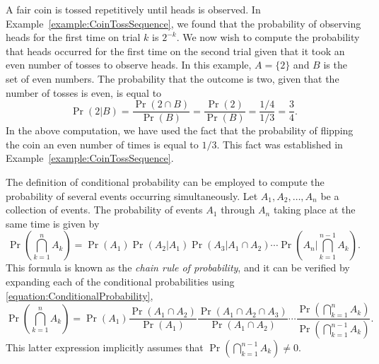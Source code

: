 \begin{example}
A fair coin is tossed repetitively until heads is observed.
In Example~\ref{example:CoinTossSequence}, we found that the probability of observing heads for the first time on trial $k$ is $2^{-k}$.
We now wish to compute the probability that heads occurred for the first time on the second trial given that it took an even number of tosses to observe heads.
In this example, $A = \{ 2 \}$ and $B$ is the set of even numbers.
The probability that the outcome is two, given that the number of tosses is even, is equal to
\begin{equation*}
\Pr ( 2 | B )
= \frac{\Pr ( 2 \cap B )}{\Pr (B)}
= \frac{\Pr (2)}{\Pr (B)}
= \frac{1/4}{1/3}
= \frac{3}{4} .
\end{equation*}
In the above computation, we have used the fact that the probability of flipping the coin an even number of times is equal to $1/3$.
This fact was established in Example~\ref{example:CoinTossSequence}.
\end{example}

The definition of conditional probability can be employed to compute the probability of several events occurring simultaneously.
Let $A_1, A_2, \ldots, A_n$ be a collection of events.
The probability of events $A_1$ through $A_n$ taking place at the same time is given by
\begin{equation} \label{equation:SimultaneousEvents}
\Pr \left( \bigcap_{k=1}^n A_k \right)
= \Pr (A_1) \Pr (A_2 | A_1) \Pr (A_3 | A_1 \cap A_2)
\cdots \Pr \left( A_n \bigg| \bigcap_{k=1}^{n-1} A_k \right) .
\end{equation}
This formula is known as the \emph{chain rule of probability}, and it can be verified by expanding each of the conditional probabilities using \eqref{equation:ConditionalProbability},
\begin{equation*}
\Pr \left( \bigcap_{k=1}^n A_k \right)
= \Pr (A_1) \frac{\Pr (A_1 \cap A_2)}{\Pr (A_1)}
\frac{\Pr (A_1 \cap A_2 \cap A_3)}{\Pr (A_1 \cap A_2)}
\cdots \frac{\Pr \left( \bigcap_{k=1}^{n} A_k \right)}
{\Pr \left( \bigcap_{k=1}^{n-1} A_k \right)} .
\end{equation*}
This latter expression implicitly assumes that $\Pr \left( \bigcap_{k=1}^{n-1} A_k \right) \neq 0$.

